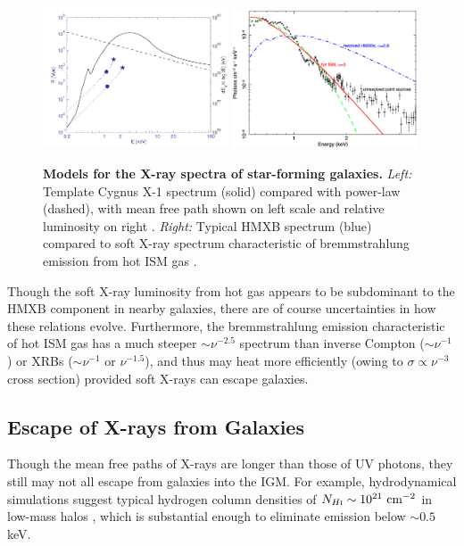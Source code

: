 \begin{figure}[]
\begin{center}
\includegraphics[width=0.49\textwidth]{Mirocha/fialkov2014_cygx1.pdf}
\includegraphics[width=0.49\textwidth]{Mirocha/pacucci2014_fig1.pdf}
\end{center}
\caption{{\bf Models for the X-ray spectra of star-forming galaxies.} \textit{Left:} Template Cygnus X-1 spectrum (solid) compared with power-law (dashed), with mean free path shown on left scale and relative luminosity on right \cite{Fialkov2014b}. \textit{Right:} Typical HMXB spectrum (blue) compared to soft X-ray spectrum characteristic of bremmstrahlung emission from hot ISM gas \cite{Pacucci2014}.}
\label{fig:xray_seds}
\end{figure}


Though the soft X-ray luminosity from hot gas appears to be subdominant to the HMXB component in nearby galaxies, there are of course uncertainties in how these relations evolve. Furthermore, the bremmstrahlung emission characteristic of hot ISM gas has a much steeper $\sim \nu^{-2.5}$ spectrum than inverse Compton ($\sim \nu^{-1}$) or XRBs ($\sim \nu^{-1}$ or $\nu^{-1.5}$), and thus may heat more efficiently (owing to $\sigma \propto \nu^{-3}$ cross section) provided soft X-rays can escape galaxies. 

\subsection{Escape of X-rays from Galaxies}
Though the mean free paths of X-rays are longer than those of UV photons, they still may not all escape from galaxies into the IGM. For example, hydrodynamical simulations suggest typical hydrogen column densities of $\NHI \sim 10^{21} \ \mathrm{cm}^{-2}$ in low-mass halos \cite{Das2017}, which is substantial enough to eliminate emission below $\sim 0.5$ keV. 


